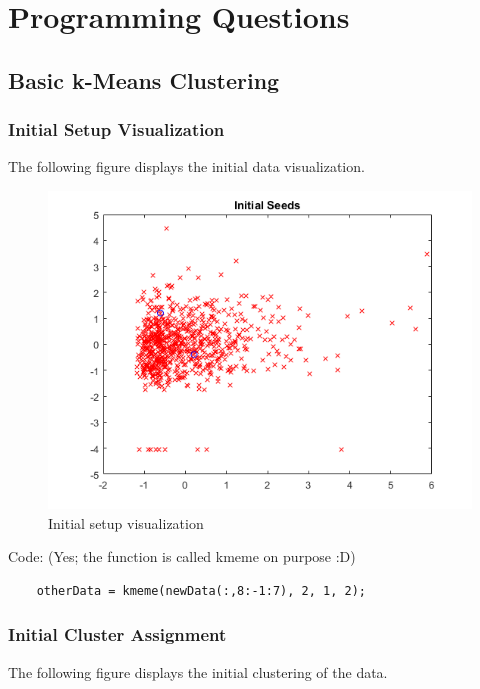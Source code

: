 \documentclass[12pt]{article}
\begin{document}
\maketitle

\newpage
\section{Programming Questions}
\subsection{Basic k-Means Clustering}
\subsubsection{Initial Setup Visualization}
The following figure displays the initial data visualization.

\begin{figure}[h!]
    \begin{center}
        \includegraphics[scale=1.2]{TQ2_a.png}
        \caption{Initial setup visualization}
    \end{center}
\end{figure}
Code: (Yes; the function is called kmeme on purpose :D)
\begin{verbatim}
    otherData = kmeme(newData(:,8:-1:7), 2, 1, 2);
\end{verbatim}
\newpage

\subsubsection{Initial Cluster Assignment}
The following figure displays the initial clustering of the data.
\end{document}
